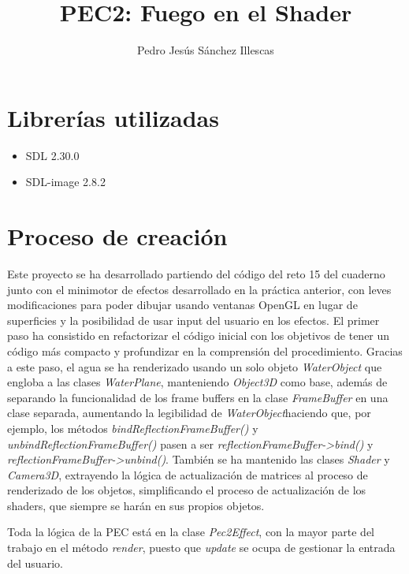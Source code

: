 \documentclass[12pt]{article}%
\begin{document}
\sloppy

\title{PEC2: Fuego en el Shader}
\author{Pedro Jesús Sánchez Illescas}

\maketitle

\newpage

\tableofcontents

\newpage

\section{Librerías utilizadas}
\begin{itemize}
	\item SDL 2.30.0
	\item SDL-image 2.8.2
\end{itemize}

\section{Proceso de creación}
	
	Este proyecto se ha desarrollado partiendo del código del reto 15 del cuaderno junto con el minimotor de efectos desarrollado en la práctica anterior, con leves modificaciones para poder dibujar usando ventanas OpenGL en lugar de superficies y la posibilidad de usar input del usuario en los efectos. El primer paso ha consistido en refactorizar el código inicial con los objetivos de tener un código más compacto y profundizar en la comprensión del procedimiento. Gracias a este paso, el agua se ha renderizado usando un solo objeto \textit{WaterObject} que engloba a las clases \textit{WaterPlane}, manteniendo \textit{Object3D} como base, además de separando la funcionalidad de los frame buffers en la clase \textit{FrameBuffer} en una clase separada, aumentando la legibilidad de \textit{WaterObject}haciendo que, por ejemplo, los métodos \textit{bindReflectionFrameBuffer()} y \textit{unbindReflectionFrameBuffer()} pasen a ser \textit{reflectionFrameBuffer->bind()} y \textit{reflectionFrameBuffer->unbind()}. También se ha mantenido las clases \textit{Shader} y \textit{Camera3D}, extrayendo la lógica de actualización de matrices al proceso de renderizado de los objetos, simplificando el proceso de actualización de los shaders, que siempre se harán en sus propios objetos.
	
	Toda la lógica de la PEC está en la clase \textit{Pec2Effect}, con la mayor parte del trabajo en el método \textit{render}, puesto que \textit{update} se ocupa de gestionar la entrada del usuario.
	
\end{document}
